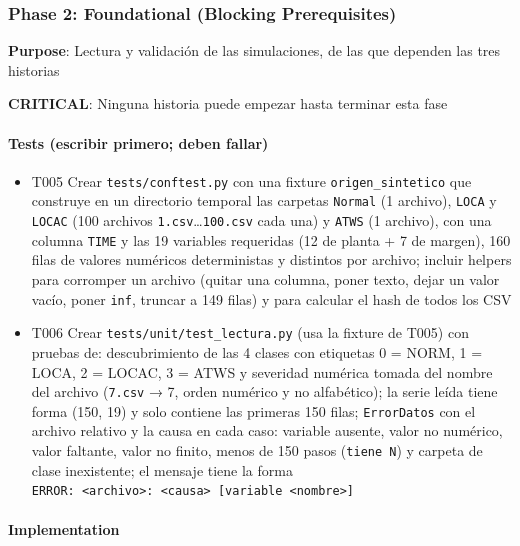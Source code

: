 \documentclass[12pt,a4paper]{article}
\providecommand{\tightlist}{\setlength{\itemsep}{0pt}\setlength{\parskip}{0pt}}
\newenvironment{documentogenerado}[2]{%
  \def\doccomando{#1}\def\docruta{#2}%
  \par\begingroup\small\setstretch{1.15}\sloppy%
}{\endgroup\par\medskip}
\begin{document}
\begin{documentogenerado}{/speckit-tasks (fase 7: /speckit-converge)}{specs\slash 001-preparacion-datos\slash tasks.md}
\subsubsection{Phase 2: Foundational (Blocking Prerequisites)}

\textbf{Purpose}: Lectura y validación de las simulaciones, de las que dependen las tres historias

\textbf{CRITICAL}: Ninguna historia puede empezar hasta terminar esta fase

\paragraph{Tests (escribir primero; deben fallar)}

\begin{itemize}
\tightlist
\item[$\boxtimes$]
  T005 Crear \texttt{tests/\allowbreak{}conftest.\allowbreak{}py} con una fixture \texttt{origen\_\allowbreak{}sintetico} que construye en un directorio temporal las carpetas \texttt{Normal} (1 archivo), \texttt{LOCA} y \texttt{LOCAC} (100 archivos \texttt{1.\allowbreak{}csv}\ldots{}\texttt{100.\allowbreak{}csv} cada una) y \texttt{ATWS} (1 archivo), con una columna \texttt{TIME} y las 19 variables requeridas (12 de planta + 7 de margen), 160 filas de valores numéricos deterministas y distintos por archivo; incluir helpers para corromper un archivo (quitar una columna, poner texto, dejar un valor vacío, poner \texttt{inf}, truncar a 149 filas) y para calcular el hash de todos los CSV
\item[$\boxtimes$]
  T006 Crear \texttt{tests/\allowbreak{}unit/\allowbreak{}test\_\allowbreak{}lectura.\allowbreak{}py} (usa la fixture de T005) con pruebas de: descubrimiento de las 4 clases con etiquetas 0 = NORM, 1 = LOCA, 2 = LOCAC, 3 = ATWS y severidad numérica tomada del nombre del archivo (\texttt{7.\allowbreak{}csv} → 7, orden numérico y no alfabético); la serie leída tiene forma (150, 19) y solo contiene las primeras 150 filas; \texttt{ErrorDatos} con el archivo relativo y la causa en cada caso: variable ausente, valor no numérico, valor faltante, valor no finito, menos de 150 pasos (\texttt{tiene\ N}) y carpeta de clase inexistente; el mensaje tiene la forma \texttt{ERROR:\ \textless{}archivo\textgreater{}:\ \textless{}causa\textgreater{}\ {[}variable\ \textless{}nombre\textgreater{}{]}}
\end{itemize}

\paragraph{Implementation}


\end{documentogenerado}
\end{document}
